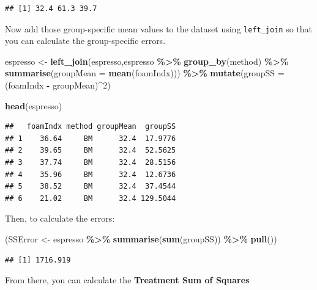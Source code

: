 \documentclass[
  a4paperpaper,
]{book}
\newenvironment{Shaded}{\begin{snugshade}}{\end{snugshade}}
\newcommand{\DataTypeTok}[1]{\textcolor[rgb]{0.13,0.29,0.53}{#1}}
\newcommand{\DecValTok}[1]{\textcolor[rgb]{0.00,0.00,0.81}{#1}}
\newcommand{\KeywordTok}[1]{\textcolor[rgb]{0.13,0.29,0.53}{\textbf{#1}}}
\newcommand{\NormalTok}[1]{#1}
\newcommand{\OperatorTok}[1]{\textcolor[rgb]{0.81,0.36,0.00}{\textbf{#1}}}
\newcommand{\StringTok}[1]{\textcolor[rgb]{0.31,0.60,0.02}{#1}}
\begin{document}
\begin{verbatim}
## [1] 32.4 61.3 39.7
\end{verbatim}

Now add those group-specific mean values to the dataset using \texttt{left\_join} so that you can calculate the group-specific errors.

\begin{Shaded}
\begin{Highlighting}[]
\NormalTok{espresso \textless{}{-}}\StringTok{ }\KeywordTok{left\_join}\NormalTok{(espresso,espresso }\OperatorTok{\%\textgreater{}\%}
\StringTok{                        }\KeywordTok{group\_by}\NormalTok{(method) }\OperatorTok{\%\textgreater{}\%}
\StringTok{                        }\KeywordTok{summarise}\NormalTok{(}\DataTypeTok{groupMean =} \KeywordTok{mean}\NormalTok{(foamIndx))) }\OperatorTok{\%\textgreater{}\%}
\StringTok{  }\KeywordTok{mutate}\NormalTok{(}\DataTypeTok{groupSS =}\NormalTok{ (foamIndx }\OperatorTok{{-}}\StringTok{ }\NormalTok{groupMean)}\OperatorTok{\^{}}\DecValTok{2}\NormalTok{)}

\KeywordTok{head}\NormalTok{(espresso)}
\end{Highlighting}
\end{Shaded}

\begin{verbatim}
##   foamIndx method groupMean  groupSS
## 1    36.64     BM      32.4  17.9776
## 2    39.65     BM      32.4  52.5625
## 3    37.74     BM      32.4  28.5156
## 4    35.96     BM      32.4  12.6736
## 5    38.52     BM      32.4  37.4544
## 6    21.02     BM      32.4 129.5044
\end{verbatim}

Then, to calculate the errors:

\begin{Shaded}
\begin{Highlighting}[]
\NormalTok{(SSError \textless{}{-}}\StringTok{ }\NormalTok{espresso }\OperatorTok{\%\textgreater{}\%}
\KeywordTok{summarise}\NormalTok{(}\KeywordTok{sum}\NormalTok{(groupSS)) }\OperatorTok{\%\textgreater{}\%}
\KeywordTok{pull}\NormalTok{())}
\end{Highlighting}
\end{Shaded}

\begin{verbatim}
## [1] 1716.919
\end{verbatim}

From there, you can calculate the \textbf{Treatment Sum of Squares}
\end{document}
